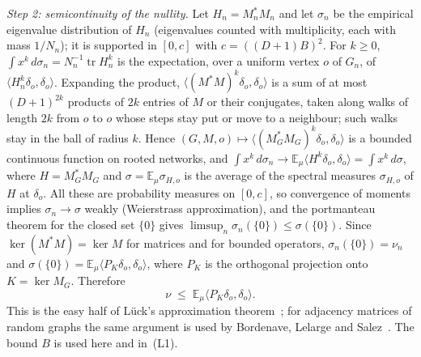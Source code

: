 \begin{informalproof}
\emph{Step 2: semicontinuity of the nullity.} Let $H_n=M_n^*M_n$ and let $\sigma_n$ be the empirical eigenvalue
distribution of $H_n$ (eigenvalues counted with multiplicity, each with mass $1/N_n$); it is supported in $[0,c]$ with
$c=((D+1)B)^2$. For $k\ge0$, $\int x^k\,d\sigma_n=N_n^{-1}\operatorname{tr}H_n^k$ is the expectation, over a uniform
vertex $o$ of $G_n$, of $\langle H_n^k\delta_o,\delta_o\rangle$. Expanding the product,
$\langle(M^*M)^k\delta_o,\delta_o\rangle$ is a sum of at most $(D+1)^{2k}$ products of $2k$ entries of $M$ or their
conjugates, taken along walks of length $2k$ from $o$ to $o$ whose steps stay put or move to a neighbour; such walks
stay in the ball of radius $k$. Hence $(G,M,o)\mapsto\langle(M_G^*M_G)^k\delta_o,\delta_o\rangle$ is a bounded continuous
function on rooted networks, and $\int x^k\,d\sigma_n\to\mathbb{E}_\mu\langle H^k\delta_o,\delta_o\rangle=\int
x^k\,d\sigma$, where $H=M_G^*M_G$ and $\sigma=\mathbb{E}_\mu\sigma_{H,o}$ is the average of the spectral measures
$\sigma_{H,o}$ of $H$ at $\delta_o$. All these are probability measures on $[0,c]$, so convergence of moments implies
$\sigma_n\to\sigma$ weakly (Weierstrass approximation), and the portmanteau theorem for the closed set $\{0\}$ gives
$\limsup_n\sigma_n(\{0\})\le\sigma(\{0\})$. Since $\ker(M^*M)=\ker M$ for matrices and for bounded operators,
$\sigma_n(\{0\})=\nu_n$ and $\sigma(\{0\})=\mathbb{E}_\mu\langle P_K\delta_o,\delta_o\rangle$, where $P_K$ is the
orthogonal projection onto $K=\ker M_G$. Therefore
\begin{equation}\label{eq:ana-step2}
  \nu\;\le\;\mathbb{E}_\mu\langle P_K\delta_o,\delta_o\rangle .
\end{equation}
This is the easy half of L\"uck's approximation theorem~\cite{Luck1994}; for adjacency matrices of random graphs the
same argument is used by Bordenave, Lelarge and Salez~\cite{BLS2011}. The bound $B$ is used here and in~(L1).


\end{informalproof}
